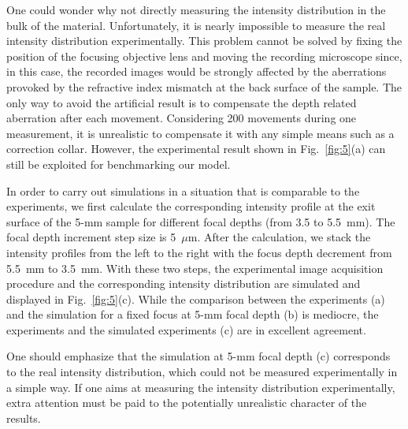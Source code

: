 \documentclass[9pt,twocolumn,twoside]{osajnl}
\begin{document}
One could wonder why not directly measuring the intensity distribution in the bulk of the material. Unfortunately, it is nearly impossible to measure the real intensity distribution experimentally. This problem cannot be solved by fixing the position of the focusing objective lens and moving the recording microscope since, in this case, the recorded images would be strongly affected by the aberrations provoked by the refractive index mismatch at the back surface of the sample. %
The only way to avoid the artificial result is to compensate the depth related aberration after each movement. Considering 200 movements during one measurement, it is unrealistic to compensate it with any simple means such as a correction collar. However, the experimental result shown in Fig.~\ref{fig:5}(a) can still be exploited for benchmarking our model.

In order to carry out simulations in a situation that is comparable to the experiments, we first calculate the corresponding intensity profile at the exit surface of the 5-mm sample for different focal depths (from 3.5 to 5.5~mm). The focal depth increment step size is 5~$\mu$m. After the calculation, we stack the intensity profiles from the left to the right with the focus depth decrement from 5.5~mm to 3.5~mm. With these two steps, the experimental image acquisition procedure and the corresponding intensity distribution are simulated and displayed in Fig.~\ref{fig:5}(c). While the comparison between the experiments (a) and the simulation for a fixed focus at 5-mm focal depth (b) is mediocre, the experiments and the simulated experiments (c) are in excellent agreement. %

One should emphasize that the simulation at 5-mm focal depth (c) corresponds to the real intensity distribution, which could not be measured experimentally in a simple way. If one aims at measuring the intensity distribution experimentally, extra attention must be paid to the potentially unrealistic character of the results.
\end{document}
